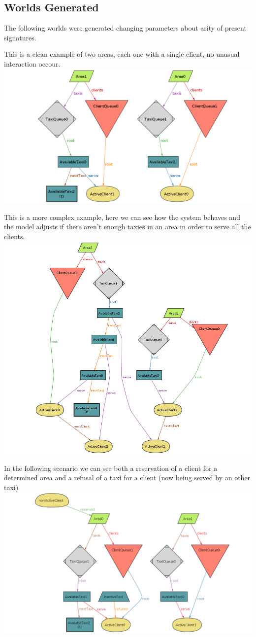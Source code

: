 \documentclass{article}
\begin{document}
\subsection{Worlds Generated}
The following worlds were generated changing parameters about arity of present signatures.\\
\begin{center}
	This is a clean example of two areas, each one with a single client, no unusual interaction occour.\\
	\includegraphics[width=.9\textwidth,height=.9\textheight,keepaspectratio]{2Areas}
\end{center}
\begin{center}
	This is a more complex example, here we can see how the system behaves and the model adjusts if there aren't enough taxies in an area in order to serve all the clients.
	\includegraphics[width=.9\textwidth,height=.9\textheight,keepaspectratio]{CrossAreaService}
\end{center}
\begin{center}
	In the following scenario we can see both a reservation of a client for a determined area and a refusal of a taxi for a client (now being served by an other taxi)
	\includegraphics[width=.9\textwidth,height=.9\textheight,keepaspectratio]{reserved-and-refused}
\end{center}
\end{document}
